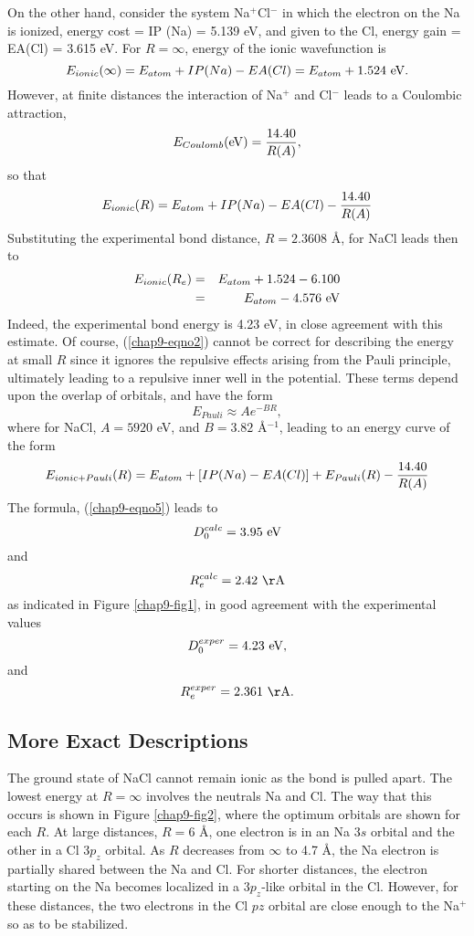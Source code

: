On the other hand, consider the system Na$^+$Cl$^-$ in which the
electron on the Na is ionized, energy cost = IP (Na) = 5.139 eV, and
given to the Cl, energy gain = EA(Cl) = 3.615 eV. For $R = \infty$,
energy of the ionic wavefunction is
$$
E_{ionic} ( \infty ) = E_{atom} + IP(Na) - EA(Cl) = E_{atom} + 
1.524 ~ {\rm eV}.
$$
However, at finite distances the interaction of Na$^+$ and Cl$^-$ leads to a
Coulombic attraction,
$$
E_{Coulomb}({\rm eV}) = {14.40 \over R(A)},
\label{chap9-eqno1}
$$
so that
$$
E_{ionic}(R) = E_{atom} + IP(Na) - EA(Cl) - {14.40 \over R(A)}
\label{chap9-eqno2}
$$
Substituting the experimental bond distance, $R = 2.3608$ \AA, for NaCl 
leads then to
\begin{eqnarray}
E_{ionic} (R_e) &=& E_{atom} + 1.524 - 6.100\cr 
&=& E_{atom} - 4.576 ~ {\rm eV}
\label{chap9-eqno3}
\end{eqnarray}
Indeed, the experimental bond energy is 4.23 eV, in close agreement
with this estimate.  Of course, (\ref{chap9-eqno2}) cannot be correct
for describing the energy at small $R$ since it ignores the repulsive
effects arising from the Pauli principle, ultimately leading to a
repulsive inner well in the potential. These terms depend upon the
overlap of orbitals, and have the form
$$
E_{Pauli} \approx Ae^{-BR},
\label{chap9-eqno4}
$$
where for NaCl, $A = 5920$ eV, and $B = 3.82$ \AA$^{-1}$, 
leading to an energy curve of the form
$$
E_{ionic+Pauli}(R) = E_{atom} + [IP(Na) - EA(Cl)] + E_{Pauli}(R) - 
{14.40 \over R(A)}
\label{chap9-eqno5}
$$
The formula, (\ref{chap9-eqno5}) leads to
$$
D^{calc}_0 = 3.95 ~ {\rm eV}
$$
and
$$
R_e^{calc} = 2.42 ~ {\rm \AA}
$$
as indicated in Figure \ref{chap9-fig1}, in good agreement with the
experimental values
$$
D_0^{exper} = 4.23 ~ {\rm eV} ,
$$
and
$$
R^{exper}_e = 2.361 ~ {\rm \AA}.
$$

\subsection{More Exact Descriptions}

The ground state of NaCl cannot remain ionic as the bond is pulled
apart.  The lowest energy at $R = \infty$ involves the neutrals Na and
Cl.  The way that this occurs is shown in Figure \ref{chap9-fig2},
where the optimum orbitals are shown for each $R$.  At large
distances, $R = 6$ \AA, one electron is in an Na $3s$ orbital and the
other in a Cl $3p_z$ orbital.  As $R$ decreases from $\infty$ to 4.7
\AA, the Na electron is partially shared between the Na and Cl. For
shorter distances, the electron starting on the Na becomes localized
in a $3p_z$-like orbital in the Cl.  However, for these distances, the
two electrons in the Cl $pz$ orbital are close enough to the Na$^+$ so
as to be stabilized.

